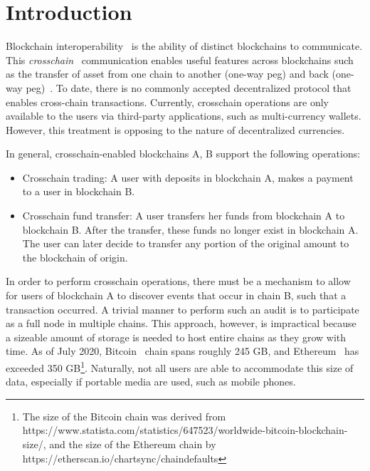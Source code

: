 \section{Introduction}

Blockchain interoperability~\cite{dionyziz} is the ability of distinct
blockchains to communicate.  This \emph{crosschain}~\cite{pow-sidechains,
pos-sidechains,burn,crosschain-sok, gtklocker} communication enables useful
features across blockchains such as the transfer of asset from one chain to
another (one-way peg) and back (one-way peg)~\cite{pow-sidechains}. To date,
there is no commonly accepted decentralized protocol that enables cross-chain
transactions. Currently, crosschain operations are only available to the users
via third-party applications, such as multi-currency wallets. However, this
treatment is opposing to the nature of decentralized currencies.

\noindent

In general, crosschain-enabled blockchains A, B support the following
operations:

\begin{itemize}
\item Crosschain trading: A user with deposits in blockchain A, makes a
    payment to a user in blockchain B.
\item Crosschain fund transfer: A user transfers her funds from blockchain
    A to blockchain B. After the transfer, these funds no longer exist in
    blockchain A. The user can later decide to transfer any portion of the
    original amount to the blockchain of origin.
\end{itemize}


\noindent

In order to perform crosschain operations, there must be a mechanism to allow
for users of blockchain A to discover events that occur in chain B, such that a
transaction occurred. A trivial manner to perform such an audit is to
participate as a full node in multiple chains. This approach, however, is
impractical because a sizeable amount of storage is needed to host entire
chains as they grow with time. As of July 2020, Bitcoin~\cite{nakamoto} chain
spans roughly 245 GB, and Ethereum~\cite{wood, buterin} has exceeded 350
GB\footnote{The size of the Bitcoin chain was derived from
    https://www.statista.com/statistics/647523/worldwide-bitcoin-blockchain-size/,
    and the size of the Ethereum chain by
https://etherscan.io/chartsync/chaindefaults}. Naturally, not all users are
able to accommodate this size of data, especially if portable media are used,
such as mobile phones.

